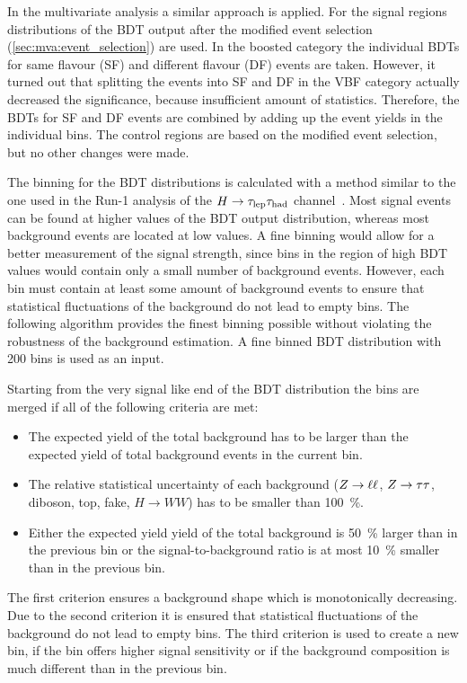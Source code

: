 In the multivariate analysis a similar approach is applied.
For the signal regions distributions of the BDT output after the modified event selection (\cref{sec:mva:event_selection}) are used.
In the boosted category the individual BDTs for same flavour (SF) and different flavour (DF) events are taken.
However, it turned out that splitting the events into SF and DF in the VBF category actually decreased the significance, because
insufficient amount of statistics.
Therefore, the BDTs for SF and DF events are combined by adding up the event yields in the individual bins.
The control regions are based on the modified event selection, but no other changes were made.

The binning for the BDT distributions is calculated with a method similar to the one used
in the Run-1 analysis of the $H \to \tau_\text{lep} \tau_\text{had}$ channel~\cite{RuthmannPhd}.
Most signal events can be found at higher values of the BDT output distribution, whereas most background events
are located at low values.
A fine binning would allow for a better measurement of the signal strength, since bins in the region of high BDT values
would contain only a small number of background events.
However, each bin must contain at least some amount of background events to ensure that statistical fluctuations of the
background do not lead to empty bins.
The following algorithm provides the finest binning possible without violating the robustness of the background estimation.
A fine binned BDT distribution with 200 bins is used as an input.

Starting from the very signal like end of the BDT distribution the bins are merged if all of the following criteria are met:
\begin{itemize}
    \item The expected yield of the total background has to be larger than the expected yield of total background events in the current bin.
    \item The relative statistical uncertainty of each background ($Z \to \ell \ell$, $Z \to \tau \tau$, diboson, top, fake, $H \to WW$) has to be smaller than \SI{100}{\percent}.
    \item Either the expected yield yield of the total background is \SI{50}{\percent} larger than in the previous bin or
        the signal-to-background ratio is at most \SI{10}{\percent} smaller than in the previous bin.
\end{itemize}

The first criterion ensures a background shape which is monotonically decreasing.
Due to the second criterion it is ensured that statistical fluctuations of the background do not lead to empty bins.
The third criterion is used to create a new bin, if the bin offers higher signal sensitivity or if the background composition
is much different than in the previous bin.

